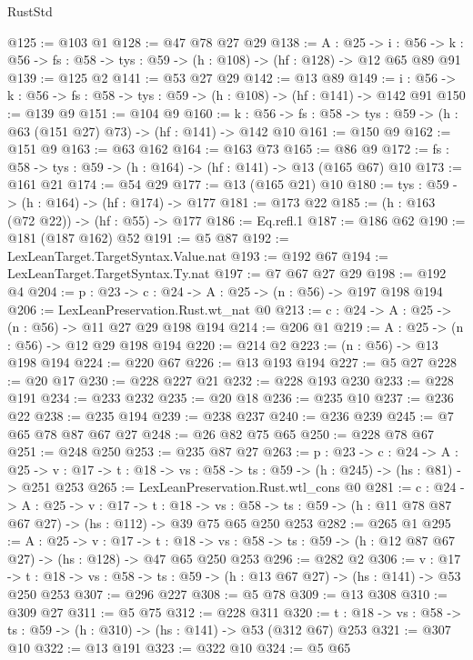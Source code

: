 \begin{lexlean}{RustStd}
\begin{coremodule}
{\begin{coremodule}
{@125 := @103 @1
@128 := @47 @78 @27 @29
@138 := {A : @25} ->
  {i : @56} ->
  {k : @56} -> {fs : @58} -> {tys : @59} -> (h : @108) -> (hf : @128) -> @12 @65 @89 @91
@139 := @125 @2
@141 := @53 @27 @29
@142 := @13 @89
@149 := {i : @56} -> {k : @56} -> {fs : @58} -> {tys : @59} -> (h : @108) -> (hf : @141) -> @142 @91
@150 := @139 @9
@151 := @104 @9
@160 := {k : @56} ->
  {fs : @58} -> {tys : @59} -> (h : @63 (@151 @27) @73) -> (hf : @141) -> @142 @10
@161 := @150 @9
@162 := @151 @9
@163 := @63 @162
@164 := @163 @73
@165 := @86 @9
@172 := {fs : @58} -> {tys : @59} -> (h : @164) -> (hf : @141) -> @13 (@165 @67) @10
@173 := @161 @21
@174 := @54 @29
@177 := @13 (@165 @21) @10
@180 := {tys : @59} -> (h : @164) -> (hf : @174) -> @177
@181 := @173 @22
@185 := (h : @163 (@72 @22)) -> (hf : @55) -> @177
@186 := Eq.refl.{1}
@187 := @186 @62
@190 := @181 (@187 @162) @52
@191 := @5 @87
@192 := LexLeanTarget.TargetSyntax.Value.nat
@193 := @192 @67
@194 := LexLeanTarget.TargetSyntax.Ty.nat
@197 := @7 @67 @27 @29
@198 := @192 @4
@204 := {p : @23} -> {c : @24} -> {A : @25} -> (n : @56) -> @197 @198 @194
@206 := LexLeanPreservation.Rust.wt_nat @0
@213 := {c : @24} -> {A : @25} -> (n : @56) -> @11 @27 @29 @198 @194
@214 := @206 @1
@219 := {A : @25} -> (n : @56) -> @12 @29 @198 @194
@220 := @214 @2
@223 := (n : @56) -> @13 @198 @194
@224 := @220 @67
@226 := @13 @193 @194
@227 := @5 @27
@228 := @20 @17
@230 := @228 @227 @21
@232 := @228 @193 @230
@233 := @228 @191
@234 := @233 @232
@235 := @20 @18
@236 := @235 @10
@237 := @236 @22
@238 := @235 @194
@239 := @238 @237
@240 := @236 @239
@245 := @7 @65 @78 @87 @67 @27
@248 := @26 @82 @75 @65
@250 := @228 @78 @67
@251 := @248 @250
@253 := @235 @87 @27
@263 := {p : @23} ->
  {c : @24} ->
  {A : @25} ->
  {v : @17} -> {t : @18} -> {vs : @58} -> {ts : @59} -> (h : @245) -> (hs : @81) -> @251 @253
@265 := LexLeanPreservation.Rust.wtl_cons @0
@281 := {c : @24} ->
  {A : @25} ->
  {v : @17} ->
  {t : @18} ->
  {vs : @58} -> {ts : @59} -> (h : @11 @78 @87 @67 @27) -> (hs : @112) -> @39 @75 @65 @250 @253
@282 := @265 @1
@295 := {A : @25} ->
  {v : @17} ->
  {t : @18} -> {vs : @58} -> {ts : @59} -> (h : @12 @87 @67 @27) -> (hs : @128) -> @47 @65 @250 @253
@296 := @282 @2
@306 := {v : @17} ->
  {t : @18} -> {vs : @58} -> {ts : @59} -> (h : @13 @67 @27) -> (hs : @141) -> @53 @250 @253
@307 := @296 @227
@308 := @5 @78
@309 := @13 @308
@310 := @309 @27
@311 := @5 @75
@312 := @228 @311
@320 := {t : @18} -> {vs : @58} -> {ts : @59} -> (h : @310) -> (hs : @141) -> @53 (@312 @67) @253
@321 := @307 @10
@322 := @13 @191
@323 := @322 @10
@324 := @5 @65
}
\end{coremodule}}
\end{coremodule}
\end{lexlean}
